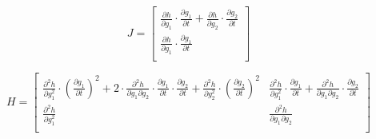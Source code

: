 \documentclass{article}
\begin{document}
\[
J = \begin{bmatrix}
\frac{\partial h}{\partial g_1} \cdot \frac{\partial g_1}{\partial t} + \frac{\partial h}{\partial g_2} \cdot \frac{\partial g_2}{\partial t} \\
\frac{\partial h}{\partial g_1} \cdot \frac{\partial g_1}{\partial t} \\
\end{bmatrix}
\]
\pagebreak

\[
H = \begin{bmatrix}
\frac{\partial^2 h}{\partial g_1^2} \cdot \left(\frac{\partial g_1}{\partial t}\right)^2 + 2 \cdot \frac{\partial^2 h}{\partial g_1 \partial g_2} \cdot \frac{\partial g_1}{\partial t} \cdot \frac{\partial g_2}{\partial t} + \frac{\partial^2 h}{\partial g_2^2} \cdot \left(\frac{\partial g_2}{\partial t}\right)^2 & \frac{\partial^2 h}{\partial g_1^2} \cdot \frac{\partial g_1}{\partial t} + \frac{\partial^2 h}{\partial g_1 \partial g_2} \cdot \frac{\partial g_2}{\partial t} \\
\frac{\partial^2 h}{\partial g_1^2} & \frac{\partial^2 h}{\partial g_1 \partial g_2} \\
\end{bmatrix}
\]
\pagebreak
\end{document}
